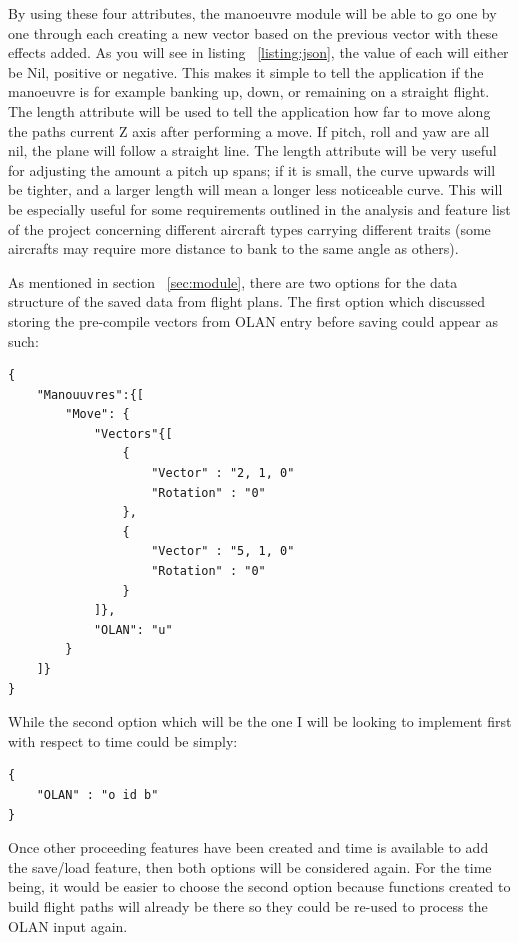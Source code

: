 By using these four attributes, the manoeuvre module will be able to go one by one through each creating a new vector based on the previous vector with these effects added. As you will see in listing ~\ref{listing:json}, the value of each will either be Nil, positive or negative. This makes it simple to tell the application if the manoeuvre is for example banking up, down, or remaining on a straight flight. The length attribute will be used to tell the application how far to move along the paths current Z axis after performing a move. If pitch, roll and yaw are all nil, the plane will follow a straight line. The length attribute will be very useful for adjusting the amount a pitch up spans; if it is small, the curve upwards will be tighter, and a larger length will mean a longer less noticeable curve. This will be especially useful for some requirements outlined in the analysis and feature list of the project concerning different aircraft types carrying different traits (some aircrafts may require more distance to bank to the same angle as others).

As mentioned in section ~\ref{sec:module}, there are two options for the data structure of the saved data from flight plans. The first option which discussed storing the pre-compile vectors from OLAN entry before saving could appear as such:

\lstset{language=JavaScript}
\medskip
\begin{lstlisting}[caption=A JSON means of holding break downs of manouvres with each one holding information on different variants of the move such as inverse and reverse and description of the OLAN notation]
{
	"Manouuvres":{[
		"Move": {
			"Vectors"{[
				{
					"Vector" : "2, 1, 0"
					"Rotation" : "0"
				},
				{
					"Vector" : "5, 1, 0"
					"Rotation" : "0"
				}
			]},
			"OLAN": "u"
		}
	]}
}
\end{lstlisting}
\label{listing:json}

While the second option which will be the one I will be looking to implement first with respect to time could be simply:

\lstset{language=JavaScript}
\medskip
\begin{lstlisting}[caption=A JSON means of holding break downs of manouvres with each one holding information on different variants of the move such as inverse and reverse and description of the OLAN notation]
{
	"OLAN" : "o id b"
}
\end{lstlisting}
\label{listing:json}

Once other proceeding features have been created and time is available to add the save/load feature, then both options will be considered again. For the time being, it would be easier to choose the second option because functions created to build flight paths will already be there so they could be re-used to process the OLAN input again.

